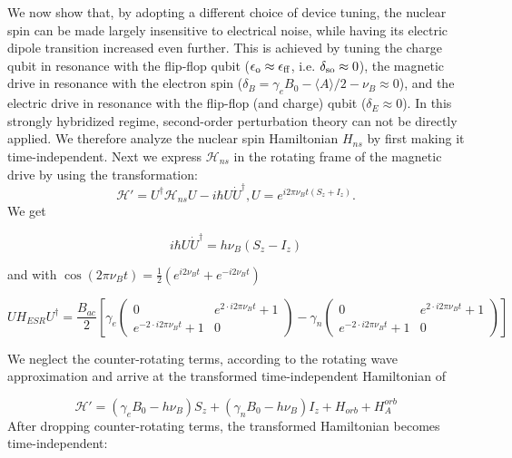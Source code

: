 We now show that, by adopting a different choice of device tuning, the nuclear spin can be made largely insensitive to electrical noise, while having its electric dipole transition increased even further. This is achieved by tuning the charge qubit in resonance with the flip-flop qubit ($\epsilon_{\rm o} \approx \epsilon_{\rm ff}$, i.e. $\delta_{\rm so}\approx 0$), the magnetic drive in resonance with the electron spin ($\delta_B = \gamma_eB_0 - \langle A \rangle /2 -\nu_B\approx 0$), and the electric drive in resonance with the flip-flop (and charge) qubit ($\delta_E \approx 0$). In this strongly hybridized regime, second-order perturbation theory can not be directly applied. We therefore analyze the nuclear spin Hamiltonian $H_{ns}$ by first making it time-independent. Next we express $\mathcal{H}_{ns}$ in the rotating frame of the magnetic drive by using the transformation:
\begin{subequations}
\begin{equation}
\mathcal{H}'=U^\dagger\mathcal{H}_{ns}U-i\hbar U\dot{U}^\dagger,
\end{equation}
\begin{equation}
U=e^{i2\pi\nu_Bt\left(S_z+I_z\right)}.
\end{equation}
\end{subequations}
We get

\begin{equation}
i\hbar U\dot{U}^\dagger=h\nu_B\left(S_z-I_z\right)
\end{equation}

and with $\cos(2\pi\nu_B t)=\frac{1}{2}\left(e^{i2\nu_B t}+e^{-i2\nu_B t}\right)$

\begin{equation}
UH_{ESR}U^\dagger=\frac{B_{ac}}{2}\left[\gamma_e
\begin{pmatrix}
0 & e^{2\cdot i2\pi\nu_Bt}+1\\
e^{-2\cdot i2\pi\nu_Bt}+1 & 0
\end{pmatrix}-
\gamma_n\begin{pmatrix}
0 & e^{2\cdot i2\pi\nu_Bt}+1\\
e^{-2\cdot i2\pi\nu_Bt}+1 & 0
\end{pmatrix}\right]
\end{equation}

We neglect the counter-rotating terms, according to the rotating wave approximation and arrive at the transformed time-independent Hamiltonian of 

\begin{equation}
\mathcal{H'}=\left(\gamma_e B_0 - h\nu_B\right)S_z+\left(\gamma_nB_0-h\nu_B\right)I_z+H_{orb}+H_A^{orb}
\end{equation}
After dropping counter-rotating terms, the transformed Hamiltonian becomes time-independent:

